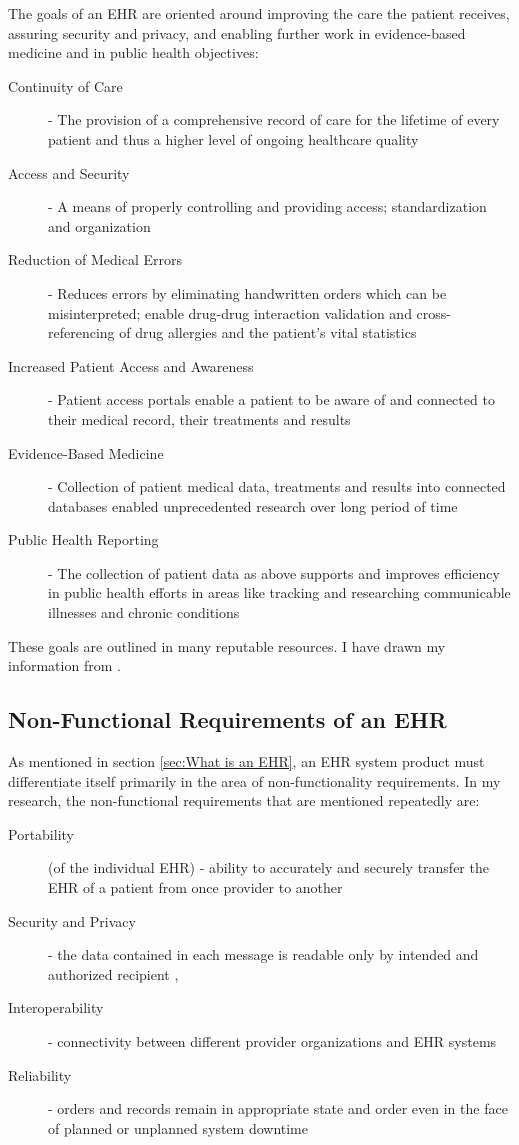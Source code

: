 \documentclass[10pt]{article}
\begin{document}
The goals of an EHR are oriented around improving the care the patient receives, assuring security and privacy, and enabling further work in evidence-based medicine and in public health objectives: 
\begin{description}
\item[Continuity of Care] - The provision of a comprehensive record of care for the lifetime of every patient and thus a higher level of ongoing healthcare quality
\item[Access and Security] - A means of properly controlling and providing access; standardization and organization
\item[Reduction of Medical Errors] - Reduces errors by eliminating handwritten orders which can be misinterpreted; enable drug-drug interaction validation and cross-referencing of drug allergies and the patient's vital statistics
\item[Increased Patient Access and Awareness] - Patient access portals enable a patient to be aware of and connected to their medical record, their treatments and results
\item[Evidence-Based Medicine] - Collection of patient medical data, treatments and results into connected databases enabled unprecedented research over long period of time
\item[Public Health Reporting] - The collection of patient data as above supports and improves efficiency in public health efforts in areas like tracking and researching communicable illnesses and chronic conditions
\end{description}

These goals are outlined in many reputable resources. I have drawn my information from \cite{ehrbook}.

\subsection{Non-Functional Requirements of an EHR}
\label{sec:NFR of an EHR}

As mentioned in section \ref{sec:What is an EHR}, an EHR system product must differentiate itself primarily in the area of non-functionality requirements.
In my research, the non-functional requirements that are mentioned repeatedly are:
\begin{description}
	\item[Portability] (of the individual EHR) - ability to accurately and securely transfer the EHR of a patient from once provider to another \cite{ehrbook}
	\item[Security and Privacy] - the data contained in each message is readable only by intended and authorized recipient \cite{ehrbook}, \cite{auditingprivacy}
	\item[Interoperability] - connectivity between different provider organizations and EHR systems \cite{ehrbook}
	\item[Reliability] - orders and records remain in appropriate state and order even in the face of planned or unplanned system downtime  \cite{ehrbook}
\end{description}
\end{document}
